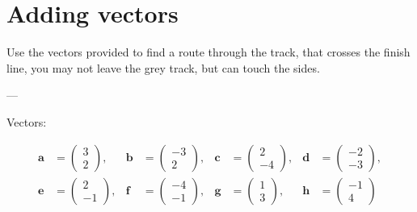 \documentclass[12pt,a4paper]{article}
\begin{document}
\vspace{0.5cm}

\section*{Adding vectors}

Use the vectors provided to find a route through the track, that crosses the finish line, you may not leave the grey track, but can touch the sides.

---

Vectors:

\[
\begin{aligned}
\mathbf{a} &= \begin{pmatrix} 3 \\ 2 \end{pmatrix}, &
\mathbf{b} &= \begin{pmatrix} -3 \\ 2 \end{pmatrix}, &
\mathbf{c} &= \begin{pmatrix} 2 \\ -4 \end{pmatrix}, &
\mathbf{d} &= \begin{pmatrix} -2 \\ -3 \end{pmatrix}, \\[6pt]
\mathbf{e} &= \begin{pmatrix} 2 \\ -1 \end{pmatrix}, &
\mathbf{f} &= \begin{pmatrix} -4 \\ -1 \end{pmatrix}, &
\mathbf{g} &= \begin{pmatrix} 1 \\ 3 \end{pmatrix}, &
\mathbf{h} &= \begin{pmatrix} -1 \\ 4 \end{pmatrix}
\end{aligned}
\]
\end{document}
